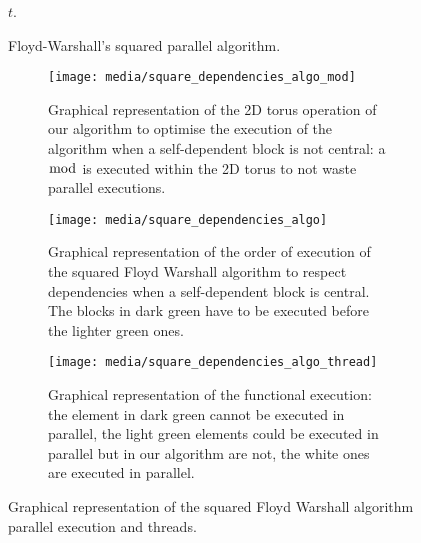 \begin{figure}[htbp]
\begin{minipage}{\textwidth}
\begin{algorithm}[H]
{{{                        \(t\).
                    }
                }
            }
            \caption{Floyd-Warshall's squared parallel algorithm.}
            \label{fw-squared}
        \end{algorithm}
    \end{minipage}
\end{figure}

\begin{figure}[htbp]
    \centering
    \begin{subfigure}[t]{0.3\textwidth}
        \texttt{[image: media/square\_dependencies\_algo\_mod]}
        
        \caption{Graphical representation of the 2D torus operation of our algorithm to optimise the execution of the algorithm when a self-dependent block is not central: a \(\bmod\) is executed within the 2D torus to not waste parallel executions.}
        \label{square-dependecies-circular}
    \end{subfigure}
    \hfill
    \begin{subfigure}[t]{0.3\textwidth}
        \texttt{[image: media/square\_dependencies\_algo]}
        
        \caption{Graphical representation of the order of execution of the squared Floyd Warshall algorithm to respect dependencies when a self-dependent block is central. The blocks in dark green have to be executed before the lighter green ones.}
        \label{square-dependecies-algo}
    \end{subfigure}
    \hfill
    \begin{subfigure}[t]{0.3\textwidth}
        \texttt{[image: media/square\_dependencies\_algo\_thread]}
        
        \caption{Graphical representation of the functional execution: the element in dark green cannot be executed in parallel, the light green elements could be executed in parallel but in our algorithm are not, the white ones are executed in parallel.}
        \label{square-dependecies-thread}
    \end{subfigure}
    \caption{Graphical representation of the squared Floyd Warshall algorithm parallel execution and threads.}
    \label{square-algo}
\end{figure}

